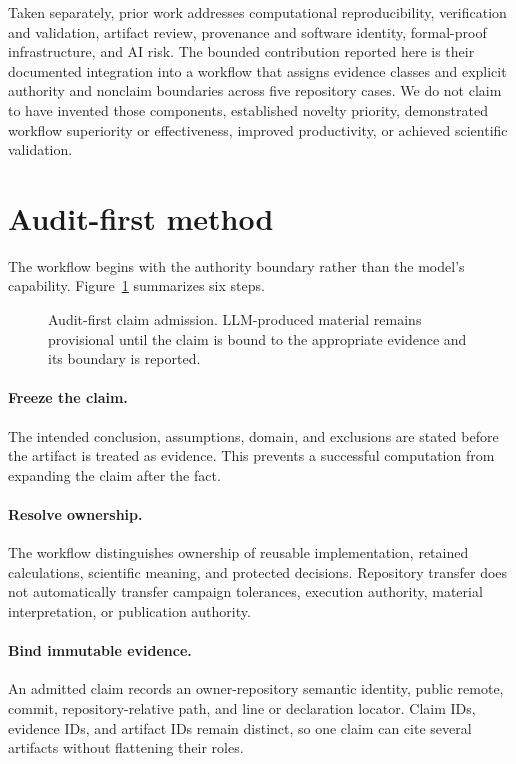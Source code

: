 \documentclass[11pt]{article}
\begin{document}
Taken separately, prior work addresses computational reproducibility,
verification and validation, artifact review, provenance and software identity,
formal-proof infrastructure, and AI risk. The bounded contribution reported
here is their documented integration into a workflow that assigns evidence
classes and explicit authority and nonclaim boundaries across five repository
cases. We do not claim to have invented those components, established novelty
priority, demonstrated workflow superiority or effectiveness, improved
productivity, or achieved scientific validation.

\section{Audit-first method}
\label{sec:method}

The workflow begins with the authority boundary rather than the model's
capability. Figure~\ref{fig:workflow} summarizes six steps.

\begin{figure}[htbp]
  \centering
  
  \caption{Audit-first claim admission. LLM-produced material remains
  provisional until the claim is bound to the appropriate evidence and its
  boundary is reported.}
  \label{fig:workflow}
\end{figure}

\paragraph{Freeze the claim.}
The intended conclusion, assumptions, domain, and exclusions are stated before
the artifact is treated as evidence. This prevents a successful computation
from expanding the claim after the fact.

\paragraph{Resolve ownership.}
The workflow distinguishes ownership of reusable implementation, retained
calculations, scientific meaning, and protected decisions. Repository transfer
does not automatically transfer campaign tolerances, execution authority,
material interpretation, or publication authority.

\paragraph{Bind immutable evidence.}
An admitted claim records an owner-repository semantic identity, public remote,
commit, repository-relative path, and line or declaration locator. Claim IDs,
evidence IDs, and artifact IDs remain distinct, so one claim can cite several
artifacts without flattening their roles.
\end{document}
